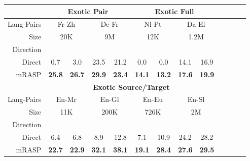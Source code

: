 \documentclass[11pt,a4paper]{article}
\newcommand{\mf}[1]{\multicolumn{2}{c}{ #1}}
\newcommand{\smf}[1]{\multicolumn{2}{c}{#1}}
\newcommand{\method}{mRASP\xspace}
\newcommand{\baseline}{Direct}
\begin{document}
\begin{table*}[ht]
\begin{center}
\begin{tabular}{rcccccccccccc}
\toprule
& \multicolumn{4}{c}{\textbf{Exotic Pair}} & \multicolumn{4}{c}{\textbf{Exotic Full}} \\
\midrule

Lang-Pairs& 
\mf{Fr-Zh} &
\mf{De-Fr} &
\mf{Nl-Pt} &
\mf{Da-El} & 

\\



Size &
\smf{20K}  & 
\smf{9M}  & 
\smf{12K} & 
\smf{1.2M} & 

\\


Direction & 
  & &

  & &

  & &

  & \\



\midrule
\baseline &
0.7 & 3.0 & 23.5 & 21.2 &  0.0 & 0.0 & 14.1 & 16.9 

\\


\method &
\bf 25.8 & \bf 26.7 &
 \bf 29.9 & \bf 23.4 &
\bf 14.1 & \bf 13.2 &
\bf 17.6 &\bf 19.9

\\
\midrule
\midrule

& \multicolumn{8}{c}{\textbf{Exotic Source/Target}} \\
\midrule


Lang-Pairs &
\mf{En-Mr} &
\mf{En-Gl} &
\mf{En-Eu} &
\mf{En-Sl}
\\


Size &
\smf{11K} & 
\smf{200K} & 
\smf{726K} & 
\smf{2M}
\\


 Direction & 
  & &

  & &

  & &

  & \\



\midrule
\baseline &
6.4 & 6.8 & 8.9 & 12.8 & 7.1 & 10.9 & 24.2 & 28.2  

\\


\method &
\bf 22.7 & \bf 22.9 & 
\bf 32.1 & \bf 38.1 & 
\bf 19.1 & \bf 28.4 & 
\bf 27.6 & \bf 29.5 

\\





\end{tabular}
\end{center}
\end{table*}
\end{document}
